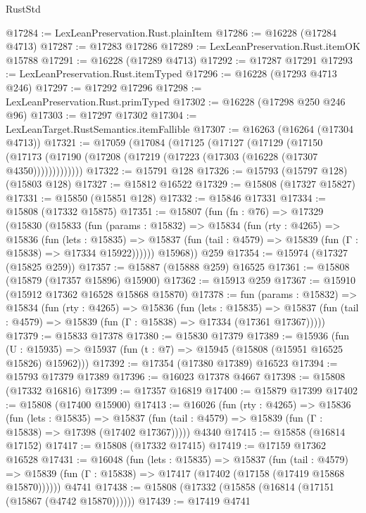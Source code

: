 \begin{lexlean}{RustStd}
\begin{coremodule}
@17284 := LexLeanPreservation.Rust.plainItem
@17286 := @16228 (@17284 @4713)
@17287 := @17283 @17286
@17289 := LexLeanPreservation.Rust.itemOK @15788
@17291 := @16228 (@17289 @4713)
@17292 := @17287 @17291
@17293 := LexLeanPreservation.Rust.itemTyped
@17296 := @16228 (@17293 @4713 @246)
@17297 := @17292 @17296
@17298 := LexLeanPreservation.Rust.primTyped
@17302 := @16228 (@17298 @250 @246 @96)
@17303 := @17297 @17302
@17304 := LexLeanTarget.RustSemantics.itemFallible
@17307 := @16263 (@16264 (@17304 @4713))
@17321 := @17059
    (@17084
      (@17125
        (@17127
          (@17129
            (@17150
              (@17173 (@17190 (@17208 (@17219 (@17223 (@17303 (@16228 (@17307 @4350)))))))))))))
@17322 := @15791 @128
@17326 := @15793 (@15797 @128) (@15803 @128)
@17327 := @15812 @16522
@17329 := @15808 (@17327 @15827)
@17331 := @15850 (@15851 @128)
@17332 := @15846 @17331
@17334 := @15808 (@17332 @15875)
@17351 := @15807
    (fun (fn : @76) =>
    @17329
      (@15830
        (@15833
          (fun (params : @15832) =>
          @15834
            (fun (rty : @4265) =>
            @15836
              (fun (lets : @15835) =>
              @15837 (fun (tail : @4579) => @15839 (fun (Γ : @15838) => @17334 @15922))))))
        @15968))
    @259
@17354 := @15974 (@17327 (@15825 @259))
@17357 := @15887 (@15888 @259) @16525
@17361 := @15808 (@15879 (@17357 @15896) @15900)
@17362 := @15913 @259
@17367 := @15910 (@15912 @17362 @16528 @15868 @15870)
@17378 := fun (params : @15832) =>
  @15834
    (fun (rty : @4265) =>
    @15836
      (fun (lets : @15835) =>
      @15837 (fun (tail : @4579) => @15839 (fun (Γ : @15838) => @17334 (@17361 @17367)))))
@17379 := @15833 @17378
@17380 := @15830 @17379
@17389 := @15936
    (fun (U : @15935) => @15937 (fun (t : @7) => @15945 (@15808 (@15951 @16525 @15826) @15962)))
@17392 := @17354 (@17380 @17389) @16523
@17394 := @15793 @17379 @17389
@17396 := @16023 @17378 @4667
@17398 := @15808 (@17332 @16816)
@17399 := @17357 @16819
@17400 := @15879 @17399
@17402 := @15808 (@17400 @15900)
@17413 := @16026
    (fun (rty : @4265) =>
    @15836
      (fun (lets : @15835) =>
      @15837 (fun (tail : @4579) => @15839 (fun (Γ : @15838) => @17398 (@17402 @17367)))))
    @4340
@17415 := @15858 (@16814 @17152)
@17417 := @15808 (@17332 @17415)
@17419 := @17159 @17362 @16528
@17431 := @16048
    (fun (lets : @15835) =>
    @15837
      (fun (tail : @4579) =>
      @15839 (fun (Γ : @15838) => @17417 (@17402 (@17158 (@17419 @15868 @15870))))))
    @4741
@17438 := @15808 (@17332 (@15858 (@16814 (@17151 (@15867 (@4742 @15870))))))
@17439 := @17419 @4741

\end{coremodule}
\end{lexlean}
